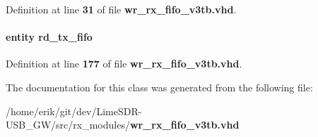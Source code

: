 Definition at line {\bf 31} of file {\bf wr\+\_\+rx\+\_\+fifo\+\_\+v3tb.\+vhd}.

\paragraph[{txfifo\+\_\+rd}]{ {\bfseries \textcolor{keywordflow}{entity}\textcolor{vhdlchar}{ }\textcolor{vhdlchar}{rd\+\_\+tx\+\_\+fifo}\textcolor{vhdlchar}{ }} \hspace{0.3cm}{\ttfamily [Instantiation]}}\label{classwr__rx__fifo__v3tb_1_1tb__behave_a4b491940b134506384e92128e138f3dc}


Definition at line {\bf 177} of file {\bf wr\+\_\+rx\+\_\+fifo\+\_\+v3tb.\+vhd}.



The documentation for this class was generated from the following file\+:\begin{DoxyCompactItemize}
\item 
/home/erik/git/dev/\+Lime\+S\+D\+R-\/\+U\+S\+B\+\_\+\+G\+W/src/rx\+\_\+modules/{\bf wr\+\_\+rx\+\_\+fifo\+\_\+v3tb.\+vhd}\end{DoxyCompactItemize}
